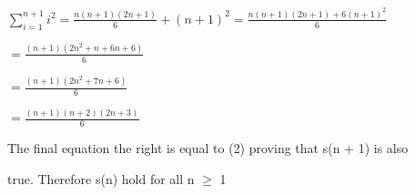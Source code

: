 \documentclass[12pt]{article}
\begin{document}
$\sum_{i=1}^{n+1}i^2 = \frac{n(n+1)(2n+1)}{6} + (n + 1)^2 = \frac{n(n+1)(2n+1)+6(n+1)^2}{6}$\par

\vspace{5mm} %

\hfil $=  \frac{(n+1)(2n^2+n+6n+6)}{6}$\par

\vspace{5mm} %

\hfil $=  \frac{(n+1)(2n^2+7n+6)}{6}$\par

\vspace{5mm} %

\hfil $=  \frac{(n+1)(n + 2)(2n + 3)}{6}$\par

\vspace{5mm} %

The final equation the right is equal to (2) proving that s(n + 1) is also\par true.
Therefore s(n) hold for all n $\geq$ 1
\end{document}
